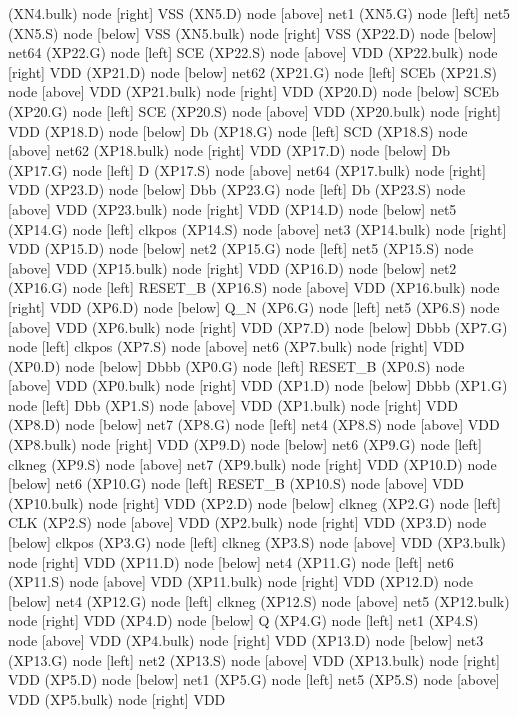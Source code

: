 \begin{circuitikz}[american]
	(XN4.bulk) node [right]	{VSS}
	(XN5.D) node [above]	{net1}
	(XN5.G) node [left]	{net5}
	(XN5.S) node [below]	{VSS}
	(XN5.bulk) node [right]	{VSS}
	(XP22.D) node [below]	{net64}
	(XP22.G) node [left]	{SCE}
	(XP22.S) node [above]	{VDD}
	(XP22.bulk) node [right]	{VDD}
	(XP21.D) node [below]	{net62}
	(XP21.G) node [left]	{SCEb}
	(XP21.S) node [above]	{VDD}
	(XP21.bulk) node [right]	{VDD}
	(XP20.D) node [below]	{SCEb}
	(XP20.G) node [left]	{SCE}
	(XP20.S) node [above]	{VDD}
	(XP20.bulk) node [right]	{VDD}
	(XP18.D) node [below]	{Db}
	(XP18.G) node [left]	{SCD}
	(XP18.S) node [above]	{net62}
	(XP18.bulk) node [right]	{VDD}
	(XP17.D) node [below]	{Db}
	(XP17.G) node [left]	{D}
	(XP17.S) node [above]	{net64}
	(XP17.bulk) node [right]	{VDD}
	(XP23.D) node [below]	{Dbb}
	(XP23.G) node [left]	{Db}
	(XP23.S) node [above]	{VDD}
	(XP23.bulk) node [right]	{VDD}
	(XP14.D) node [below]	{net5}
	(XP14.G) node [left]	{clkpos}
	(XP14.S) node [above]	{net3}
	(XP14.bulk) node [right]	{VDD}
	(XP15.D) node [below]	{net2}
	(XP15.G) node [left]	{net5}
	(XP15.S) node [above]	{VDD}
	(XP15.bulk) node [right]	{VDD}
	(XP16.D) node [below]	{net2}
	(XP16.G) node [left]	{RESET_B}
	(XP16.S) node [above]	{VDD}
	(XP16.bulk) node [right]	{VDD}
	(XP6.D) node [below]	{Q_N}
	(XP6.G) node [left]	{net5}
	(XP6.S) node [above]	{VDD}
	(XP6.bulk) node [right]	{VDD}
	(XP7.D) node [below]	{Dbbb}
	(XP7.G) node [left]	{clkpos}
	(XP7.S) node [above]	{net6}
	(XP7.bulk) node [right]	{VDD}
	(XP0.D) node [below]	{Dbbb}
	(XP0.G) node [left]	{RESET_B}
	(XP0.S) node [above]	{VDD}
	(XP0.bulk) node [right]	{VDD}
	(XP1.D) node [below]	{Dbbb}
	(XP1.G) node [left]	{Dbb}
	(XP1.S) node [above]	{VDD}
	(XP1.bulk) node [right]	{VDD}
	(XP8.D) node [below]	{net7}
	(XP8.G) node [left]	{net4}
	(XP8.S) node [above]	{VDD}
	(XP8.bulk) node [right]	{VDD}
	(XP9.D) node [below]	{net6}
	(XP9.G) node [left]	{clkneg}
	(XP9.S) node [above]	{net7}
	(XP9.bulk) node [right]	{VDD}
	(XP10.D) node [below]	{net6}
	(XP10.G) node [left]	{RESET_B}
	(XP10.S) node [above]	{VDD}
	(XP10.bulk) node [right]	{VDD}
	(XP2.D) node [below]	{clkneg}
	(XP2.G) node [left]	{CLK}
	(XP2.S) node [above]	{VDD}
	(XP2.bulk) node [right]	{VDD}
	(XP3.D) node [below]	{clkpos}
	(XP3.G) node [left]	{clkneg}
	(XP3.S) node [above]	{VDD}
	(XP3.bulk) node [right]	{VDD}
	(XP11.D) node [below]	{net4}
	(XP11.G) node [left]	{net6}
	(XP11.S) node [above]	{VDD}
	(XP11.bulk) node [right]	{VDD}
	(XP12.D) node [below]	{net4}
	(XP12.G) node [left]	{clkneg}
	(XP12.S) node [above]	{net5}
	(XP12.bulk) node [right]	{VDD}
	(XP4.D) node [below]	{Q}
	(XP4.G) node [left]	{net1}
	(XP4.S) node [above]	{VDD}
	(XP4.bulk) node [right]	{VDD}
	(XP13.D) node [below]	{net3}
	(XP13.G) node [left]	{net2}
	(XP13.S) node [above]	{VDD}
	(XP13.bulk) node [right]	{VDD}
	(XP5.D) node [below]	{net1}
	(XP5.G) node [left]	{net5}
	(XP5.S) node [above]	{VDD}
	(XP5.bulk) node [right]	{VDD}
\fi


\end{circuitikz}
